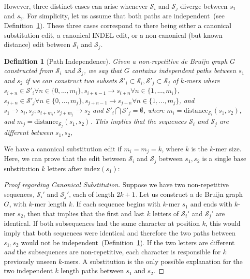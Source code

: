 \documentclass[phd]{ucbthesis}
\newtheorem{defn}{Definition}
\begin{document}
However, three distinct cases can arise whenever $\mathcal{S}_i$ and $\mathcal{S}_j$ diverge between
$s_1$ and $s_2$. For simplicity, let us assume that both paths are independent~(see
Definition~\ref{defn:path-independence}). These three cases correspond to there being either a canonical
substitution edit, a canonical INDEL edit, or a non-canonical (but known distance) edit between
$\mathcal{S}_i$ and $\mathcal{S}_j$.

\begin{defn}[Path Independence]
\label{defn:path-independence}
Given a non-repetitive de Bruijn graph $G$ constructed from $\mathcal{S}_i$ and $\mathcal{S}_j$, we say
that $G$ contains independent paths between $s_1$ and $s_2$ if we can construct two subsets
$\mathcal{S}'_i \subset \mathcal{S}_i, \mathcal{S}'_j \subset \mathcal{S}_j$ of $k$-mers where $s_{i + n}
\in \mathcal{S}'_i \forall n \in \{0, \dots, m_i\}, s_{i + n - 1} \rightarrow s_{i + n} \forall n \in \{1, \dots, m_i\}$,
$s_{j + n} \in \mathcal{S}'_j \forall n \in \{0, \dots, m_j\}, s_{j + n - 1} \rightarrow s_{j + n} \forall n \in \{1,
\dots, m_j\}$, and $s_1 \rightarrow s_i, s_j; s_{i + m_i}, s_{j + m_j} \rightarrow s_2$ and $\mathcal{S}'_i
\bigcap \mathcal{S}'_j = \emptyset$, where $m_i = \text{distance}_{\mathcal{S}_i}(s_1, s_2)$, and $m_j =
\text{distance}_{\mathcal{S}_j}(s_1, s_2)$. This implies that the sequences $\mathcal{S}_i$ and
$\mathcal{S}_j$ are different between $s_1, s_2$,
\end{defn}

We have a canonical substitution edit if $m_i = m_j = k$, where $k$ is the $k$-mer size. Here, we can
prove that the edit between $\mathcal{S}_i$ and $\mathcal{S}_j$ between $s_1, s_2$ is a single base
substitution $k$ letters after $\text{index}(s_1)$:

\begin{proof}[Proof regarding Canonical Substitution]
\label{proof:canonical-substitution}
Suppose we have two non-repetitive sequences, $\mathcal{S}_i'$ and $\mathcal{S}_j'$, each of length
$2k + 1$. Let us construct a de Bruijn graph $G$, with $k$-mer length $k$. If each sequence begins with
$k$-mer $s_1$ and ends with $k$-mer $s_2$, then that implies that the first and last $k$ letters of
$\mathcal{S}_i'$ and $\mathcal{S}_j'$ are identical. If both subsequences had the same character at
position $k$, this would imply that both sequences were identical and therefore the two paths between
$s_1, s_2$ would not be independent~(Definition~\ref{defn:path-independence}). If the two letters are
different \emph{and} the subsequences are non-repetitive, each character is responsible for $k$
previously unseen $k$-mers. A substitution is the only possible explanation for the two independent $k$ length
paths between $s_1$ and $s_2$.
\end{proof}
\end{document}
